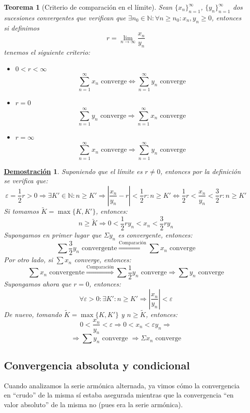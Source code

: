 \documentclass[10pt,a4paper,openright]{book}
\theoremstyle{break}
\newtheorem{theo}{Teorema}[chapter]
\newtheorem*{demo}{\underline{Demostración}}
\begin{document}
\begin{theo}[Criterio de comparación en el límite]
Sean $\{x_n\}_{n=1}^\infty$, $\{y_n\}_{n=1}^\infty$ dos sucesiones convergentes que verifican que $\exists n_0 \in \mathbb{N}: \forall n \geq n_0 : x_n , y_n \geq 0$, entonces si definimos
$$r = \lim_{n \rightarrow \infty} \frac{x_n}{y_n}$$
tenemos el siguiente criterio:
\begin{itemize}
\item $0< r <\infty$
$$\sum_{n=1}^{\infty} x_n \mbox{ converge} \Leftrightarrow \sum_{n=1}^{\infty} y_n \mbox{ converge}$$
\item $r = 0$
$$\sum_{n=1}^{\infty} y_n \mbox{ converge} \Rightarrow \sum_{n=1} ^{\infty} x_n \mbox{ converge}$$
\item $r= \infty$
$$\sum_{n=1}^{\infty} x_n \mbox{ converge} \Rightarrow \sum_{n=1} ^{\infty} y_n \mbox{ converge}$$
\end{itemize}
\end{theo}
\begin{demo}
Suponiendo que el límite es $r \neq 0$, entonces por la definición se verifica que:
$$\varepsilon = \frac{1}{2} r>0 \Rightarrow \exists K' \in \mathbb{N} : n \geq K' \Rightarrow | \frac{x_n}{y_n} - r|< \frac{1}{2} r : n \geq K' \Leftrightarrow \frac{1}{2} r <\frac{x_n}{y_n} < \frac{3}{2} r : n \geq K'$$
Si tomamos $\tilde{K} = \max \{K, K'\}$, entonces:
$$n \geq \tilde{K} \Rightarrow 0 <\frac{1}{2} r y_n < x_n < \frac{3}{2} r y_n $$
Supongamos en primer lugar que $\Sigma y_n$ es convergente, entonces:
$$\sum \frac{3}{2} y_n\mbox{ convergente} \overset{\mbox{Comparación}}{\Rightarrow} \sum x_n \mbox{ converge}$$
Por otro lado, si $\sum x_n$ converge, entonces:
$$\sum x_n\mbox{ convergente} \overset{\mbox{Comparación}}{\Rightarrow} \sum \frac{1}{2} y_n \mbox{ converge}\Rightarrow \sum y_n\mbox{ converge}$$
Supongamos ahora que $r=0$, entonces:
$$\forall \varepsilon >0: \exists K': n \geq K' \Rightarrow |\frac{x_n}{y_n}| < \varepsilon$$
De nuevo, tomando $\tilde{K} = \max \{K, K'\}$ y $n \geq \tilde{K}$, entonces:
$$0 < \frac{x_n}{y_n} < \varepsilon \Rightarrow 0 < x_n < \varepsilon y_n \Rightarrow$$
$$\Rightarrow \sum y_n \mbox{ converge }\Rightarrow \Sigma x_n \mbox{ converge}$$
\end{demo}

\subsection{Convergencia absoluta y condicional}
Cuando analizamos la serie armónica alternada, ya vimos cómo la convergencia en ``crudo'' de la misma sí estaba asegurada mientras que la convergencia ``en valor absoluto'' de la misma no (pues era la serie armónica).
\end{document}
